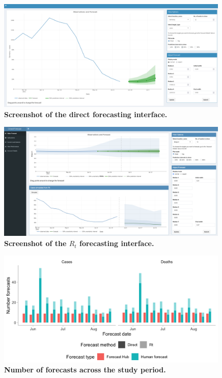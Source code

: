 \documentclass[10pt,a4paper,twocolumn]{article}
\begin{document}
  
\begin{figure}[H]
\centering
\includegraphics[width=0.99\textwidth]{../output/figures/screenshot-crowd-classical.png}
\caption{\bf{Screenshot of the direct forecasting interface.}}
\label{fig:screenshot-classical}
\end{figure}


\begin{figure}[H]
\centering
\includegraphics[width=0.99\textwidth]{../output/figures/screenshot-crowd-rt-app.png}
\caption{\bf{Screenshot of the $R_t$ forecasting interface.}}
\label{fig:screenshot-rt}
\end{figure}

\begin{figure}[H]
\centering
\includegraphics[width=0.99\textwidth]{../output/figures/num-forecasters.png}
\caption{\bf{Number of forecasts across the study period.}}
\label{fig:num-forecasters}
\end{figure}
\end{document}
